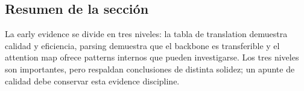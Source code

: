 
\subsection{Resumen de la sección}

La early evidence se divide en tres niveles: la tabla de translation demuestra calidad y eficiencia, parsing demuestra que el backbone es transferible y el attention map ofrece patterns internos que pueden investigarse. Los tres niveles son importantes, pero respaldan conclusiones de distinta solidez; un apunte de calidad debe conservar esta evidence discipline.
